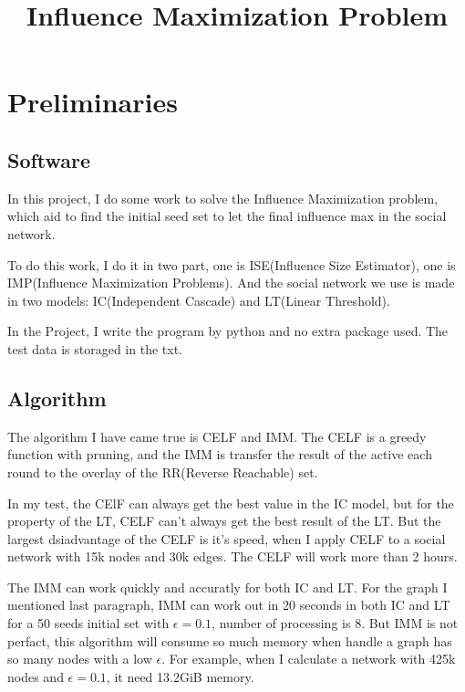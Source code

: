 \documentclass[conference,compsoc]{IEEEtran}
\begin{document}
\title{Influence Maximization Problem}
\author{
}
\maketitle
\IEEEpeerreviewmaketitle 



\section{Preliminaries}
  \subsection{Software}
    In this project, I do some work to solve the Influence Maximization problem, which aid to find the initial seed set to let the final influence max in the social network.

    To do this work, I do it in two part, one is ISE(Influence Size Estimator), one is IMP(Influence Maximization Problems). And the social network we use is made in two models: IC(Independent Cascade) and LT(Linear Threshold).

    In the Project, I write the program by python and no extra package used. The test data is storaged in the txt. 

  \subsection{Algorithm}
    The algorithm I have came true is CELF and IMM. 
    The CELF is a greedy function with pruning, and the IMM is transfer the result of the active each round to the overlay of the RR(Reverse Reachable) set.
    
    In my test, the CElF can always get the best value in the IC model, but for the property of the LT, CELF can't always get the best result of the LT. But the largest dsiadvantage of the CELF is it's speed, when I apply CELF to a social network with 15k nodes and 30k edges. The CELF will work more than 2 hours.

    The IMM can work quickly and accuratly for both IC and LT. For the graph I mentioned last paragraph, IMM can work out in 20 seconds in both IC and LT for a 50 seeds initial set with $\epsilon = 0.1$, number of processing is 8.
    But IMM is not perfact, this algorithm will consume so much memory when handle a graph has so many nodes with a low $\epsilon$. For example, when I calculate a network with 425k nodes and $\epsilon = 0.1$, it need 13.2GiB memory.
    
\end{document}
